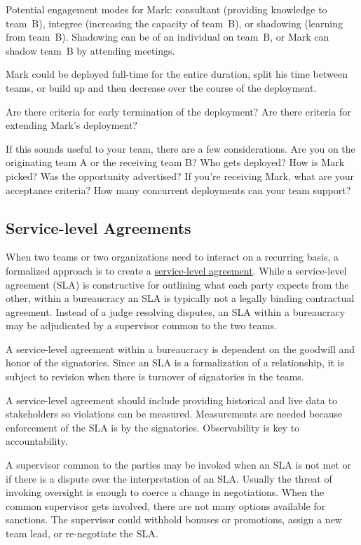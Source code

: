 Potential engagement modes for Mark: consultant (providing knowledge to team~B), integree (increasing the capacity of team~B), or shadowing (learning from team~B). Shadowing can be of an individual on team~B, or Mark can shadow team~B by attending meetings. 


Mark could be deployed full-time for the entire duration, split his time between teams, or build up and then decrease over the course of the deployment.

Are there criteria for early termination of the deployment? Are there criteria for extending Mark's deployment?

If this sounds useful to your team, there are a few considerations. Are you on the originating team A or the receiving team B? Who gets deployed? How is Mark picked? Was the opportunity advertised? If you're receiving Mark, what are your acceptance criteria? How many concurrent deployments can your team support?


\subsection*{Service-level Agreements\label{sec:sla}}

When two teams or two organizations need to interact on a recurring basis, a formalized approach is to create a \href{https://en.wikipedia.org/wiki/Service-level_agreement}{service-level agreement}. 
While a service-level agreement (SLA) is constructive for outlining what each party expects from the other, within a bureaucracy an SLA is typically not a legally binding contractual agreement. Instead of a judge resolving disputes, an SLA within a bureaucracy may be adjudicated by a supervisor common to the two teams.

A service-level agreement within a bureaucracy is dependent on the goodwill and honor of the signatories. Since an SLA is a formalization of a relationship, it is subject to revision when there is turnover of signatories in the teams. 

A service-level agreement should include providing historical and live data to stakeholders so violations can be measured. Measurements are needed because enforcement of the SLA is by the signatories. Observability is key to accountability. 

A supervisor common to the parties may be invoked when an SLA is not met or if there is a dispute over the interpretation of an SLA. Usually the threat of invoking oversight is enough to coerce a change in negotiations. 
When the common supervisor gets involved, there are not many options available for sanctions. The supervisor could withhold bonuses or promotions,  assign a new team lead, or re-negotiate the SLA. 

